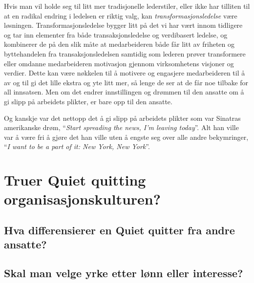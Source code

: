 \documentclass[a4paper, 12pt]{article}  %
\begin{document}
Hvis man vil holde seg til litt mer tradisjonelle lederstiler, eller ikke har tilliten til at en radikal endring i ledelsen er riktig valg, kan \emph{transformasjonsledelse} være løsningen. 
Transformasjonsledelse bygger litt på det vi har vært innom tidligere og tar inn elementer fra både transaksjonsledelse og verdibasert ledelse, og kombinerer de på den slik måte at medarbeideren både får litt av friheten og byttehandelen fra transaksjonsledelsen samtidig som lederen prøver transformere eller omdanne medarbeideren motivasjon gjennom virksomhetens visjoner og verdier. 
Dette kan være nøkkelen til å motivere og engasjere medarbeideren til å av og til gi det lille ekstra og yte litt mer, så lenge de ser at de får noe tilbake for all innsatsen. 
Men om det endrer innstillingen og drømmen til den ansatte om å gi slipp på arbeidets plikter, er bare opp til den ansatte.

Og kanskje var det nettopp det å gi slipp på arbeidets plikter som var Sinatras amerikanske drøm, ``\emph{Start spreading the news, I'm leaving today}''. Alt han ville var å være fri å gjøre det han ville uten å engste seg over alle andre bekymringer, ``\emph{I want to be a part of it: New York, New York}''.

\newpage
\section{Truer Quiet quitting organisasjonskulturen?}

\subsection{Hva differensierer en Quiet quitter fra andre ansatte?}

\subsection{Skal man velge yrke etter lønn eller interesse?}

\newpage
\printbibliography[heading=bibintoc] %
\end{document}
